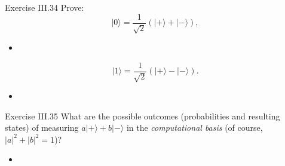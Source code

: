 \documentclass[letterpaper]{article}
\begin{document}
\begin{section}{Exercise III.34}
  Prove:
  $$|0\rangle=\frac{1}{\sqrt{2}}(|+\rangle+|-\rangle),$$
  \begin{itemize}
      \item %
  \end{itemize}
  $$|1\rangle=\frac{1}{\sqrt{2}}(|+\rangle-|-\rangle).$$
  \begin{itemize}
      \item %
  \end{itemize}
\end{section}
\begin{section}{Exercise III.35}
  What are the possible outcomes (probabilities and resulting states) of measuring $a|+\rangle+b|-\rangle$ in the \emph{computational basis} (of course, $|a|^2+|b|^2=1$)?
  \begin{itemize}
      \item %
  \end{itemize}
\end{section}
\end{document}
